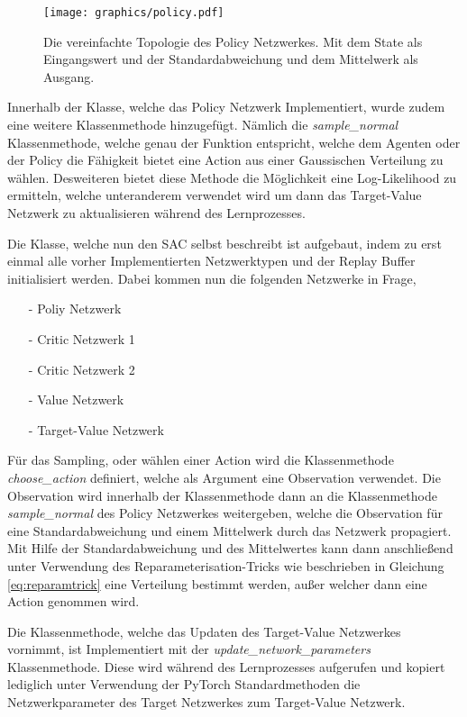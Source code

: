 \documentclass[]{iat}
\begin{document}
\begin{figure}[H]
    \texttt{[image: graphics/policy.pdf]}
    \centering
    \caption{Die vereinfachte Topologie des Policy Netzwerkes. Mit dem State als Eingangswert und der Standardabweichung und dem Mittelwerk als Ausgang.}
    \label{abb:policy_network}
\end{figure}

Innerhalb der Klasse, welche das Policy Netzwerk Implementiert, wurde zudem eine weitere Klassenmethode hinzugefügt. Nämlich die \textit{sample\_normal} Klassenmethode, welche genau der Funktion entspricht, welche dem Agenten oder der Policy die Fähigkeit bietet eine Action aus einer Gaussischen Verteilung zu wählen. Desweiteren bietet diese Methode die Möglichkeit eine Log-Likelihood zu ermitteln, welche unteranderem verwendet wird um dann das Target-Value Netzwerk zu aktualisieren während des Lernprozesses.

Die Klasse, welche nun den SAC selbst beschreibt ist aufgebaut, indem zu erst einmal alle vorher Implementierten Netzwerktypen und der Replay Buffer initialisiert werden. Dabei kommen nun die folgenden Netzwerke in Frage,
\begin{enumerate}
    \item[-] Poliy Netzwerk
    \item[-] Critic Netzwerk 1
    \item[-] Critic Netzwerk 2
    \item[-] Value Netzwerk
    \item[-] Target-Value Netzwerk
\end{enumerate}
Für das Sampling, oder wählen einer Action wird die Klassenmethode \textit{choose\_action} definiert, welche als Argument eine Observation verwendet. Die Observation wird innerhalb der Klassenmethode dann an die Klassenmethode \textit{sample\_normal} des Policy Netzwerkes weitergeben, welche die Observation für eine Standardabweichung und einem Mittelwerk durch das Netzwerk propagiert. Mit Hilfe der Standardabweichung und des Mittelwertes kann dann anschließend unter Verwendung des Reparameterisation-Tricks wie beschrieben in Gleichung \ref{eq:reparamtrick} eine Verteilung bestimmt werden, außer welcher dann eine Action genommen wird.

Die Klassenmethode, welche das Updaten des Target-Value Netzwerkes vornimmt, ist Implementiert mit der \textit{update\_network\_parameters} Klassenmethode. Diese wird während des Lernprozesses aufgerufen und kopiert lediglich unter Verwendung der PyTorch Standardmethoden die Netzwerkparameter des Target Netzwerkes zum Target-Value Netzwerk.
\end{document}

